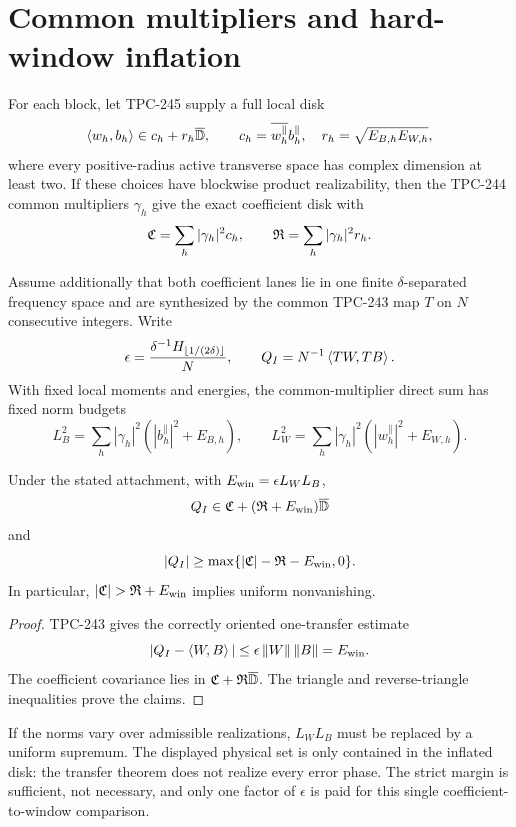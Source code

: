 \section{Common multipliers and hard-window inflation}

For each block, let TPC-245 supply a full local disk
\[
 \left\langle w_h,b_h\right\rangle\in c_h+r_h\overline{\mathbb{D}},
 \qquad
 c_h=\overline{w_h^{\parallel}}b_h^{\parallel},
 \quad r_h=\sqrt{E_{B,h}E_{W,h}},
\]
where every positive-radius active transverse space has complex dimension at
least two.  If these choices have blockwise product realizability, then the
TPC-244 common multipliers $\gamma_h$ give the exact coefficient disk with
\[
 \mathfrak{C}=\sum_h|\gamma_h|^2c_h,
 \qquad
 \mathfrak{R}=\sum_h|\gamma_h|^2r_h.
\]

Assume additionally that both coefficient lanes lie in one finite
$\delta$-separated frequency space and are synthesized by the common TPC-243
map $T$ on $N$ consecutive integers.  Write
\[
 \epsilon=\frac{\delta^{-1}H_{\lfloor1/(2\delta)\rfloor}}{N},
 \qquad
 Q_I=N^{-1}\left\langle TW,TB\right\rangle.
\]
With fixed local moments and energies, the common-multiplier direct sum has
fixed norm budgets
\[
 L_B^2=\sum_h|\gamma_h|^2
       (|b_h^{\parallel}|^2+E_{B,h}),\qquad
 L_W^2=\sum_h|\gamma_h|^2
       (|w_h^{\parallel}|^2+E_{W,h}).
\]

\begin{theorem}\label{thm:window}
Under the stated attachment, with $E_{\mathrm{win}}=\epsilon L_WL_B$,
\[
 Q_I\in\mathfrak{C}+(\mathfrak{R}+E_{\mathrm{win}})\overline{\mathbb{D}}
\]
and
\[
 |Q_I|\ge\max\{|\mathfrak{C}|-\mathfrak{R}-E_{\mathrm{win}},0\}.
\]
In particular, $|\Cagg|>\Ragg+\Ewin$ implies uniform nonvanishing.
\end{theorem}

\begin{proof}
TPC-243 gives the correctly oriented one-transfer estimate
\[
 |Q_I-\left\langle W,B\right\rangle|\le\epsilon\left\lVert W\right\rVert\left\lVert B\right\rVert=E_{\mathrm{win}}.
\]
The coefficient covariance lies in $\mathfrak{C}+\mathfrak{R}\overline{\mathbb{D}}$.  The triangle and
reverse-triangle inequalities prove the claims.
\end{proof}

If the norms vary over admissible realizations, $L_WL_B$ must be replaced by a
uniform supremum.  The displayed physical set is only contained in the
inflated disk: the transfer theorem does not realize every error phase.  The
strict margin is sufficient, not necessary, and only one factor of $\epsilon$
is paid for this single coefficient-to-window comparison.

